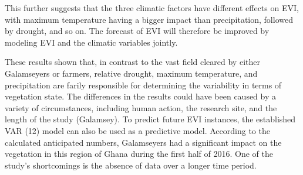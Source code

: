This further suggests that the three climatic factors have different effects on EVI, with maximum temperature having a bigger impact than precipitation, followed by drought, and so on. The forecast of EVI will therefore be improved by modeling EVI and the climatic variables jointly. 
 
These results shown that, in contrast to the vast field cleared by either Galamseyers or farmers, relative drought, maximum temperature, and precipitation are farily responsible for determining the variability in terms of vegetation state. The differences in the results could have been caused by a variety of circumstances, including human action, the research site, and the length of the study (Galamsey). To predict future EVI instances, the established VAR (12) model can also be used as a predictive model. According to the calculated anticipated numbers, Galamseyers had a significant impact on the vegetation in this region of Ghana during the first half of 2016. One of the study's shortcomings is the absence of data over a longer time period.
